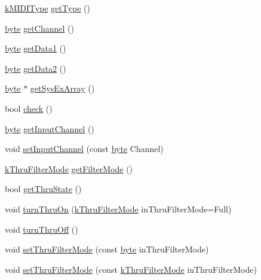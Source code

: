 \begin{CompactItemize}
\item 
\hyperlink{_m_i_d_i_8h_802feb46a169642d43b2415d02390545}{kMIDIType} \hyperlink{class_m_i_d_i___class_b43d8c2b277cf2408865b4f63111080b}{getType} ()
\item 
\hyperlink{_m_i_d_i_8h_b8ef12fab634c171394422d0ee8baf94}{byte} \hyperlink{class_m_i_d_i___class_6b7ac8309663b69decfd1bd2925fcbef}{getChannel} ()
\item 
\hyperlink{_m_i_d_i_8h_b8ef12fab634c171394422d0ee8baf94}{byte} \hyperlink{class_m_i_d_i___class_a64038c767252e358decc469ba99d4e3}{getData1} ()
\item 
\hyperlink{_m_i_d_i_8h_b8ef12fab634c171394422d0ee8baf94}{byte} \hyperlink{class_m_i_d_i___class_688f4f57142f1a7dfd1a79bf43e1b74d}{getData2} ()
\item 
\hyperlink{_m_i_d_i_8h_b8ef12fab634c171394422d0ee8baf94}{byte} $\ast$ \hyperlink{class_m_i_d_i___class_4540dd7720884677b50cff2f23d1982a}{getSysExArray} ()
\item 
bool \hyperlink{class_m_i_d_i___class_d5f7a96c5bb338946a0be1d243877155}{check} ()
\item 
\hyperlink{_m_i_d_i_8h_b8ef12fab634c171394422d0ee8baf94}{byte} \hyperlink{class_m_i_d_i___class_f05fb3c0857d2f50d6c21414eb18ef53}{getInputChannel} ()
\item 
void \hyperlink{class_m_i_d_i___class_35a66d47ba598c7ebbee7fbf654dafe8}{setInputChannel} (const \hyperlink{_m_i_d_i_8h_b8ef12fab634c171394422d0ee8baf94}{byte} Channel)
\item 
\hyperlink{_m_i_d_i_8h_315ccd12c0a15c11eca5cc4acdb6397d}{kThruFilterMode} \hyperlink{class_m_i_d_i___class_8952fc757cefe98856ba7cfc811bbbb3}{getFilterMode} ()
\item 
bool \hyperlink{class_m_i_d_i___class_76c71d380b9221207062aa669a9c0005}{getThruState} ()
\item 
void \hyperlink{class_m_i_d_i___class_7fd1759eda22c18f6122b4231e1f0a6d}{turnThruOn} (\hyperlink{_m_i_d_i_8h_315ccd12c0a15c11eca5cc4acdb6397d}{kThruFilterMode} inThruFilterMode=Full)
\item 
void \hyperlink{class_m_i_d_i___class_c1999ba222737523008d6f1c579d6816}{turnThruOff} ()
\item 
void \hyperlink{class_m_i_d_i___class_be50e76aa11dc7127bd28659c181ab77}{setThruFilterMode} (const \hyperlink{_m_i_d_i_8h_b8ef12fab634c171394422d0ee8baf94}{byte} inThruFilterMode)
\item 
void \hyperlink{class_m_i_d_i___class_33d450180a10a36bef08e68015c4d922}{setThruFilterMode} (const \hyperlink{_m_i_d_i_8h_315ccd12c0a15c11eca5cc4acdb6397d}{kThruFilterMode} inThruFilterMode)
\end{CompactItemize}


